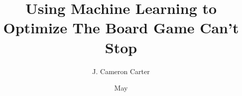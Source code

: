 \documentclass[12pt]{article}
\title{Using Machine Learning to Optimize The Board Game Can't Stop}
\author{J. Cameron Carter}
\date{May}{2026}
\begin{document}
\createtitlepage
\createsignaturepage

\createcopyrightpage

\begin{aknowledgements}
\normalsize

\end{aknowledgements}

\begin{abstract}
\normalsize

\end{abstract}

\tableofcontents 

\listoftables

\listoffigures
\end{document}
